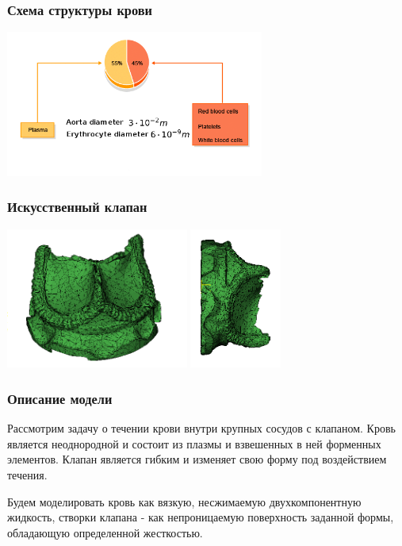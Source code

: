 \documentclass[14pt]{beamer}
\begin{document}
\begin{frame}
\frametitle{Схема структуры крови}
    \begin{center}
        \includegraphics[width=8.5cm]{blood_scheme3.png}
    \end{center}
\end{frame}

\begin{frame}
\frametitle{Искусственный клапан}
    \begin{center}
        \includegraphics[width=6cm]{real_valve_3_1.png}
        \includegraphics[width=3cm]{real_valve2_1.png}
    \end{center}
\end{frame}

\begin{frame}
\frametitle{Описание модели}
Рассмотрим задачу о течении крови внутри крупных сосудов с клапаном. Кровь
является неоднородной и состоит из плазмы и взвешенных в ней форменных
элементов. Клапан является гибким и изменяет свою форму под воздействием
течения.

Будем моделировать кровь как вязкую, несжимаемую двухкомпонентную
жидкость, створки клапана - как непроницаемую поверхность заданной формы,
обладающую определенной жесткостью.
\end{frame}
\end{document}
